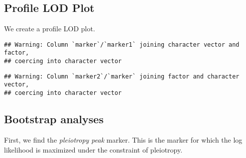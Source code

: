 \documentclass[oneside]{book}
\newenvironment{Shaded}{\begin{snugshade}}{\end{snugshade}}
\newcommand{\DataTypeTok}[1]{\textcolor[rgb]{0.13,0.29,0.53}{#1}}
\newcommand{\DecValTok}[1]{\textcolor[rgb]{0.00,0.00,0.81}{#1}}
\newcommand{\KeywordTok}[1]{\textcolor[rgb]{0.13,0.29,0.53}{\textbf{#1}}}
\newcommand{\NormalTok}[1]{#1}
\newcommand{\OperatorTok}[1]{\textcolor[rgb]{0.81,0.36,0.00}{\textbf{#1}}}
\newcommand{\StringTok}[1]{\textcolor[rgb]{0.31,0.60,0.02}{#1}}
\begin{document}
\hypertarget{profile-lod-plot}{%
\subsection{Profile LOD Plot}\label{profile-lod-plot}}

We create a profile LOD plot.

\begin{Shaded}
\end{Shaded}

\begin{verbatim}
## Warning: Column `marker`/`marker1` joining character vector and factor,
## coercing into character vector
\end{verbatim}

\begin{verbatim}
## Warning: Column `marker2`/`marker` joining factor and character vector,
## coercing into character vector
\end{verbatim}

\hypertarget{bootstrap-analyses}{%
\subsection{Bootstrap analyses}\label{bootstrap-analyses}}

First, we find the \emph{pleiotropy peak} marker. This is the marker for
which the log likelihood is maximized under the constraint of
pleiotropy.
\end{document}
